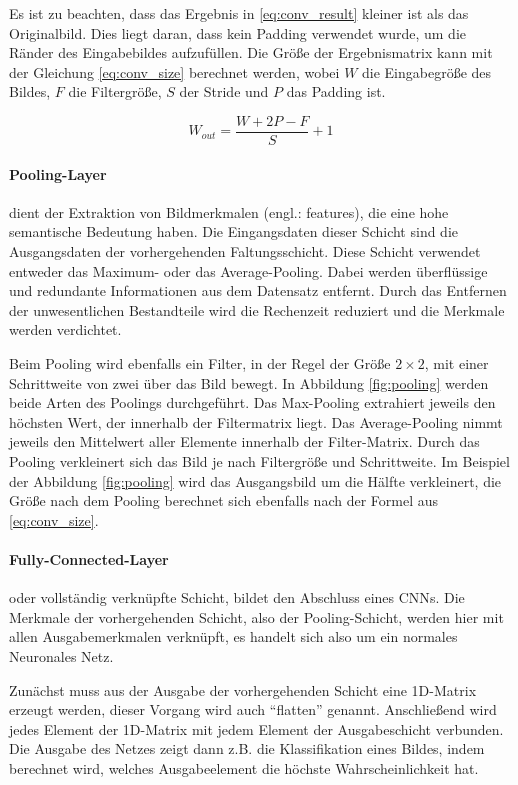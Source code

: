 Es ist zu beachten, dass das Ergebnis in \ref{eq:conv_result} kleiner ist als das Originalbild. Dies liegt daran, dass kein Padding verwendet wurde, um die Ränder des Eingabebildes aufzufüllen. Die Größe der Ergebnismatrix kann mit der Gleichung \ref{eq:conv_size} berechnet werden, wobei $W$ die Eingabegröße des Bildes, $F$ die Filtergröße, $S$ der Stride und $P$ das Padding ist. \cite[vgl.][]{Teoh2023}

\begin{equation}
	W_{out}= \dfrac{W+2P-F}{S}+1
	\label{eq:conv_size}
\end{equation}

\paragraph{Pooling-Layer} dient der Extraktion von Bildmerkmalen (engl.: features), die eine hohe semantische Bedeutung haben. Die Eingangsdaten dieser Schicht sind die Ausgangsdaten der vorhergehenden Faltungsschicht. Diese Schicht verwendet entweder das Maximum- oder das Average-Pooling. Dabei werden überflüssige und redundante Informationen aus dem Datensatz entfernt. Durch das Entfernen der unwesentlichen Bestandteile wird die Rechenzeit reduziert und die Merkmale werden verdichtet. 

Beim Pooling wird ebenfalls ein Filter, in der Regel der Größe $2\times2$, mit einer Schrittweite von zwei über das Bild bewegt. In Abbildung \ref{fig:pooling} werden beide Arten des Poolings durchgeführt. Das Max-Pooling extrahiert jeweils den höchsten Wert, der innerhalb der Filtermatrix liegt. Das Average-Pooling nimmt jeweils den Mittelwert aller Elemente innerhalb der Filter-Matrix. Durch das Pooling verkleinert sich das Bild je nach Filtergröße und Schrittweite.\cite[vgl.][]{Teoh2023} Im Beispiel der Abbildung \ref{fig:pooling} wird das Ausgangsbild um die Hälfte verkleinert, die Größe nach dem Pooling berechnet sich ebenfalls nach der Formel aus \ref{eq:conv_size}.

\paragraph{Fully-Connected-Layer} oder vollständig verknüpfte Schicht, bildet den Abschluss eines \ac{CNN}s. Die Merkmale der vorhergehenden Schicht, also der Pooling-Schicht, werden hier mit allen Ausgabemerkmalen verknüpft, es handelt sich also um ein normales Neuronales Netz. 

Zunächst muss aus der Ausgabe der vorhergehenden Schicht eine 1D-Matrix erzeugt werden, dieser Vorgang wird auch ``flatten'' genannt. Anschließend wird jedes Element der 1D-Matrix mit jedem Element der Ausgabeschicht verbunden. Die Ausgabe des Netzes zeigt dann z.B. die Klassifikation eines Bildes, indem berechnet wird, welches Ausgabeelement die höchste Wahrscheinlichkeit hat. \cite[vgl.][]{Weidman2020}


